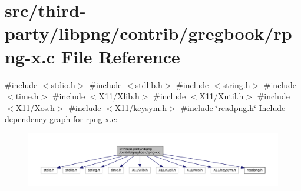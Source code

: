 \hypertarget{rpng-x_8c}{}\section{src/third-\/party/libpng/contrib/gregbook/rpng-\/x.c File Reference}
\label{rpng-x_8c}
{\ttfamily \#include $<$stdio.\+h$>$}\newline
{\ttfamily \#include $<$stdlib.\+h$>$}\newline
{\ttfamily \#include $<$string.\+h$>$}\newline
{\ttfamily \#include $<$time.\+h$>$}\newline
{\ttfamily \#include $<$X11/\+Xlib.\+h$>$}\newline
{\ttfamily \#include $<$X11/\+Xutil.\+h$>$}\newline
{\ttfamily \#include $<$X11/\+Xos.\+h$>$}\newline
{\ttfamily \#include $<$X11/keysym.\+h$>$}\newline
{\ttfamily \#include \char`\"{}readpng.\+h\char`\"{}}\newline
Include dependency graph for rpng-\/x.c\+:
\nopagebreak
\begin{figure}[H]
\begin{center}
\leavevmode
\includegraphics[width=350pt]{rpng-x_8c__incl}
\end{center}
\end{figure}
